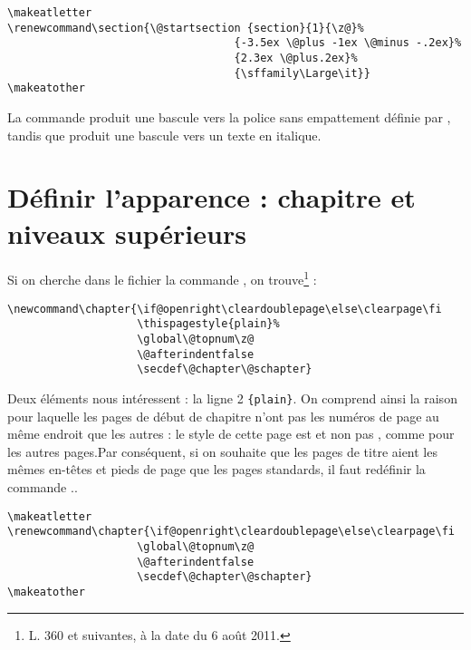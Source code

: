 \begin{verbatim}
\makeatletter
\renewcommand\section{\@startsection {section}{1}{\z@}%
                                   {-3.5ex \@plus -1ex \@minus -.2ex}%
                                   {2.3ex \@plus.2ex}%
                                   {\sffamily\Large\it}}
\makeatother
\end{verbatim}

La commande  produit une bascule vers la police sans empattement définie par , tandis que  produit une bascule vers un texte en italique.

\section{Définir l'apparence : chapitre et niveaux supérieurs}

Si on cherche dans le fichier  la commande , on trouve\footnote{L. 360 et suivantes, à la date du 6 août 2011.} :

\begin{verbatim}
\newcommand\chapter{\if@openright\cleardoublepage\else\clearpage\fi
                    \thispagestyle{plain}%
                    \global\@topnum\z@
                    \@afterindentfalse
                    \secdef\@chapter\@schapter}
\end{verbatim}

Deux éléments nous intéressent : la ligne 2 \verb|{plain}|. On comprend ainsi la raison pour laquelle les  pages de début de chapitre n'ont pas les numéros de  page au même endroit que les autres : le style de cette page est  et non pas , comme pour les autres pages.Par conséquent, si on souhaite que les pages de titre aient les mêmes en-têtes et pieds de page que les pages standards, il faut redéfinir la commande .\label{entetechapter}.\label{chapitrepagestyle}

\begin{verbatim}
\makeatletter
\renewcommand\chapter{\if@openright\cleardoublepage\else\clearpage\fi
                    \global\@topnum\z@
                    \@afterindentfalse
                    \secdef\@chapter\@schapter}
\makeatother
\end{verbatim}

